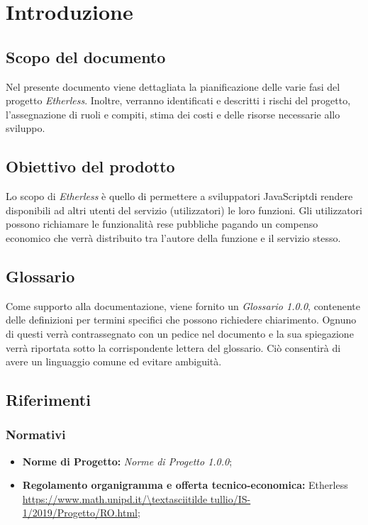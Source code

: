 \section{Introduzione}
\subsection{Scopo del documento}
Nel presente documento viene dettagliata la pianificazione delle varie fasi del progetto \textit{Etherless}. Inoltre, verranno identificati e descritti i rischi del progetto, l'assegnazione di ruoli e compiti, stima dei costi e delle risorse necessarie allo sviluppo.
\subsection{Obiettivo del prodotto}
Lo scopo di \textit{Etherless} è quello di permettere a sviluppatori JavaScript\glo di rendere disponibili ad altri utenti del servizio (utilizzatori) le loro funzioni. Gli utilizzatori possono richiamare le funzionalità rese pubbliche pagando un compenso economico che verrà distribuito tra l'autore della funzione e il servizio stesso.
\subsection{Glossario}
Come supporto alla documentazione, viene fornito un \textit{Glossario 1.0.0}\docs, contenente delle definizioni per termini specifici che possono richiedere chiarimento. Ognuno di questi verrà contrassegnato con un pedice \glo nel documento e la sua spiegazione verrà riportata sotto la corrispondente lettera del glossario. Ciò consentirà di avere un linguaggio comune ed evitare ambiguità. 
\subsection{Riferimenti}
\subsubsection{Normativi}
	\begin{itemize}
		\item \textbf{Norme di Progetto:} \textit{Norme di Progetto 1.0.0}\docs;
		\item \textbf{Regolamento organigramma e offerta tecnico-economica:} Etherless\\ 
			\url{https://www.math.unipd.it/\textasciitilde tullio/IS-1/2019/Progetto/RO.html};
	\end{itemize}

